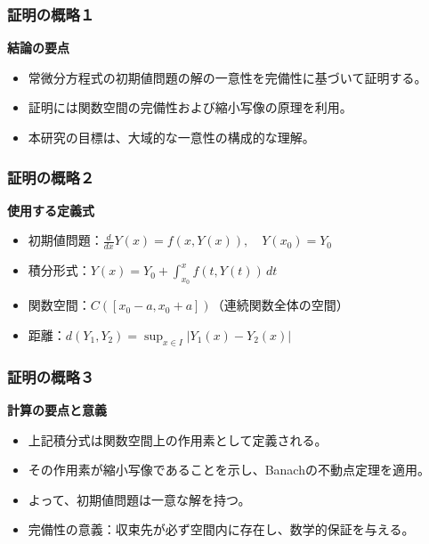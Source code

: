 \documentclass[aspectratio=169]{beamer}
\newenvironment{sectionblock}[1]{%
  \begin{minipage}{\textwidth}%
    \textbf{\large #1}\par\vspace{0.5em}%
}{%
  \end{minipage}\vspace{1em}%
}
\newcommand{\sectioncontent}[2]{%
  \begin{sectionblock}{#1}%
    \begin{itemize}%
      #2%
    \end{itemize}%
  \end{sectionblock}%
}
\begin{document}
\begin{frame}
\frametitle{証明の概略１}
\sectioncontent{結論の要点}{
  \item 常微分方程式の初期値問題の解の一意性を完備性に基づいて証明する。
  \item 証明には関数空間の完備性および縮小写像の原理を利用。
  \item 本研究の目標は、大域的な一意性の構成的な理解。
}
\end{frame}

\begin{frame}
\frametitle{証明の概略２}
\sectioncontent{使用する定義式}{
  \item 初期値問題：$\displaystyle \frac{d}{dx}Y(x) = f(x, Y(x)), \quad Y(x_0) = Y_0$
  \item 積分形式：$\displaystyle Y(x) = Y_0 + \int_{x_0}^{x} f(t, Y(t)) \, dt$
  \item 関数空間：$C([x_0 - a, x_0 + a])$（連続関数全体の空間）
  \item 距離：$d(Y_1, Y_2) = \sup_{x \in I} |Y_1(x) - Y_2(x)|$
}
\end{frame}

\begin{frame}
\frametitle{証明の概略３}
\sectioncontent{計算の要点と意義}{
  \item 上記積分式は関数空間上の作用素として定義される。
  \item その作用素が縮小写像であることを示し、Banachの不動点定理を適用。
  \item よって、初期値問題は一意な解を持つ。
  \item 完備性の意義：収束先が必ず空間内に存在し、数学的保証を与える。
}
\end{frame}
\end{document}
